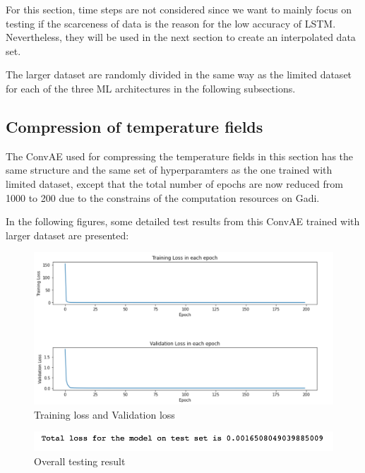 For this section, time steps are not considered since we want to mainly focus on testing if the scarceness of data is the reason for the low accuracy of LSTM. Nevertheless, they will be used in the next section to create an interpolated data set.

The larger dataset are randomly divided in the same way as the limited dataset for each of the three ML architectures in the following subsections.

\subsection{Compression of temperature fields}

The ConvAE used for compressing the temperature fields in this section has the same structure and the same set of hyperparamters as the one trained with limited dataset, except that the total number of epochs are now reduced from 1000 to 200 due to the constrains of the computation resources on Gadi.

In the following figures, some detailed test results from this ConvAE trained with larger dataset are presented:

\begin{figure}[H]
    \caption{Training loss and Validation loss}
    \includegraphics[scale=0.6]{figures/mantle_convection_images/larger_dataset/ConvAE_trainingData.png}
\end{figure}

\begin{figure}[H]
    \caption{Overall testing result}
    \includegraphics[scale=0.8]{figures/mantle_convection_images/larger_dataset/ConvAE_OverallTesting.png}
\end{figure}

